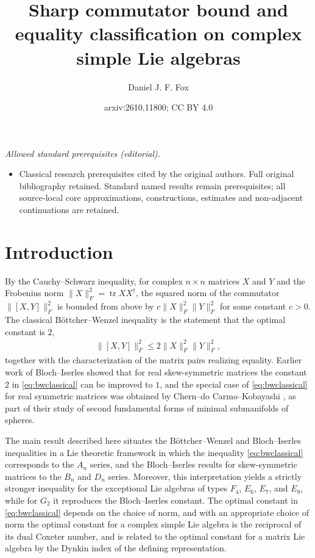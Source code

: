 \documentclass[leqno,10pt]{amsart}
\title{Sharp commutator bound and equality classification on complex simple Lie algebras}
\author{Daniel J. F. Fox}
\date{arxiv:2610.11800; CC BY 4.0}
\theoremstyle{definition}
\numberwithin{equation}{section}
\newcommand{\tr}{\operatorname{tr}}
\newcommand{\fnorm}[1]{\lVert #1\rVert_{F}}
\begin{document}
\maketitle
\noindent\textit{Allowed standard prerequisites (editorial).}\begin{itemize}
\item Classical research prerequisites cited by the original authors. Full original bibliography retained. Standard named results remain prerequisites; all source-local core approximations, constructions, estimates and non-adjacent continuations are retained.
\end{itemize}\medskip
\section{Introduction}\label{sec:intro}
By the Cauchy--Schwarz inequality, for complex $n \times n$ matrices $X$ and $Y$ and the Frobenius norm $\fnorm{X}^{2} = \tr X X^{\dagger}$, the squared norm of the commutator $\fnorm{[X, Y]}^{2}$ is bounded from above by $c\fnorm{X}^2 \fnorm{Y}^2$ for some constant $c > 0$. The classical Böttcher--Wenzel inequality \cite{Audenaert, Bottcher-Wenzel-howbig, Bottcher-Wenzel, Lu-normalscalarcurvature} is the statement that the optimal constant is $2$,
\begin{align}\label{eq:bwclassical}
\fnorm{[X, Y]}^{2} \leq 2 \fnorm{X}^2 \fnorm{Y}^2,
\end{align}
together with the characterization of the matrix pairs realizing equality. Earlier work of Bloch--Iserles \cite{Bloch-Iserles} showed that for real skew-symmetric matrices the constant $2$ in \eqref{eq:bwclassical} can be improved to $1$, and the special case of \eqref{eq:bwclassical} for real symmetric matrices was obtained by Chern--do Carmo--Kobayashi \cite{Chern-Docarmo-Kobayashi}, as part of their study of second fundamental forms of minimal submanifolds of spheres. 

The main result described here situates the Böttcher--Wenzel and Bloch--Iserles inequalities in a Lie theoretic framework in which the inequality \eqref{eq:bwclassical} corresponds to the $A_{n}$ series, and the Bloch--Iserles results for skew-symmetric matrices to the $B_{n}$ and $D_{n}$ series. Moreover, this interpretation yields a strictly stronger inequality for the exceptional Lie algebras of types $F_{4}$, $E_{6}$, $E_{7}$, and $E_{8}$, while for $G_{2}$ it reproduces the Bloch--Iserles constant. The optimal constant in \eqref{eq:bwclassical} depends on the choice of norm, and with an appropriate choice of norm the optimal constant for a complex simple Lie algebra is the reciprocal of its dual Coxeter number, and is related to the optimal constant for a matrix Lie algebra by the Dynkin index of the defining representation. 
\end{document}

